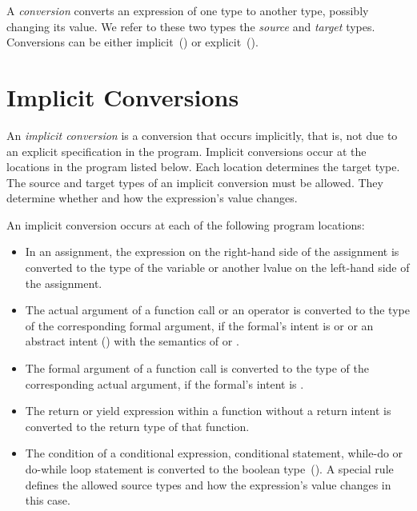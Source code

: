 \label{Conversions}

A \emph{conversion} converts an expression of one type to another type,
possibly changing its value.
We refer to these two types the \emph{source} and \emph{target} types.
Conversions can be either
implicit~() or
explicit~().


\section{Implicit Conversions}
\label{Implicit_Conversions}

An \emph{implicit conversion} is a conversion that occurs implicitly,
that is, not due to an explicit specification in the program.
Implicit conversions occur at the locations in the program listed below.
Each location determines the target type.
The source and target types of an implicit conversion must be allowed.
They determine whether and how the expression's value changes.

An implicit conversion occurs at each of the following program locations:

\begin{itemize}
\item In an assignment, the expression on the right-hand side of
      the assignment is converted to the type of the variable
      or another lvalue on the left-hand side of the assignment.

\item The actual argument of a function call or an operator is converted
      to the type of the corresponding formal argument, if the formal's
      intent is  or  or an abstract intent
      () with the semantics of
       or .

\item The formal argument of a function call is converted
      to the type of the corresponding actual argument, if the formal's
      intent is .

\item The return or yield expression within a function without a 
      return intent is converted to the return type of that function.

\item The condition of a conditional expression,
      conditional statement, while-do or do-while loop statement
      is converted to the boolean type~().
      A special rule defines the allowed source types and
      how the expression's value changes in this case.
\end{itemize}

